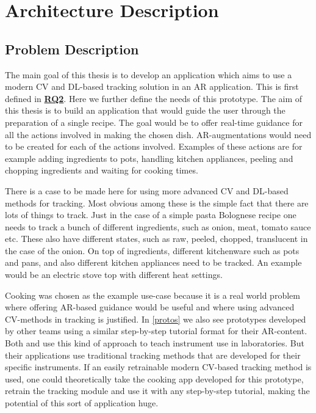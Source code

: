\chapter{Architecture Description} \label{Arch description}

\section{Problem Description} \label{probDesc}

The main goal of this thesis is to develop an application which aims to use a 
modern CV and DL-based tracking solution in an AR application. This is first 
defined in \hyperref[rq2]{\textbf{RQ2}}. Here we further define the needs of 
this prototype. The aim of this thesis is to build an application that would 
guide the user through the preparation of a single recipe. The goal would be 
to offer real-time guidance for all the actions involved in making the chosen 
dish. AR-augmentations would need to be created for each of the actions 
involved. Examples of these actions are for example adding ingredients to 
pots, handling kitchen appliances, peeling and chopping ingredients and 
waiting for cooking times. \par
	There is a case to be made here for using more advanced CV and 
DL-based methods for tracking. Most obvious among these is the simple fact 
that there are lots of things to track. Just in the case of a simple pasta 
Bolognese recipe one needs to track a bunch of different ingredients, such as 
onion, meat, tomato sauce etc. These also have different states, such as raw, 
peeled, chopped, translucent in the case of the onion. On top of ingredients, 
different kitchenware such as pots and pans, and also different kitchen 
appliances need to be tracked. An example would be an electric stove top with 
different heat settings. \par
	Cooking was chosen as the example use-case because it is a real world 
problem where offering AR-based guidance would be useful and where using 
advanced CV-methods in tracking is justified. In \ref{protos} we also see 
prototypes developed by other teams using a similar step-by-step tutorial 
format for their AR-content. Both \textcite{pylvanainen} and 
\textcite{reyesEtAl2016} use this kind of approach to teach instrument use in 
laboratories. But their applications use traditional tracking methods that 
are developed for their specific instruments. If an easily retrainable modern 
CV-based tracking method is used, one could theoretically take the cooking 
app developed for this prototype, retrain the tracking module and use it with 
any step-by-step tutorial, making the potential of this sort of application 
huge.


